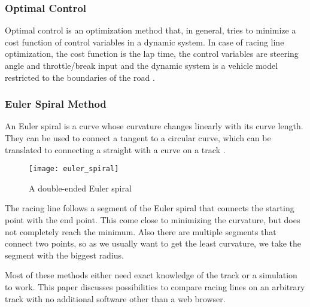 \subsubsection{Optimal Control}
Optimal control is an optimization method that, in general, tries to minimize a cost function of control variables in a dynamic system. In case of racing line optimization, the cost function is the lap time, the control variables are steering angle and throttle/break input and the dynamic system is a vehicle model restricted to the boundaries of the road \cite{gustafsson08}.

\subsubsection{Euler Spiral Method}
An Euler spiral is a curve whose curvature changes linearly with its curve length. They can be used to connect a tangent to a circular curve, which can be translated to connecting a straight with a curve on a track \cite{xiong09}.

\begin{figure}[!ht]
	\centering
	\texttt{[image: euler\_spiral]}
	\caption{A double-ended Euler spiral}
	\label{fig:euler_spiral}
\end{figure}

The racing line follows a segment of the Euler spiral that connects the starting point with the end point. This come close to minimizing the curvature, but does not completely reach the minimum. Also there are multiple segments that connect two points, so as we usually want to get the least curvature, we take the segment with the biggest radius.

Most of these methods either need exact knowledge of the track or a simulation to work. This paper discusses possibilities to compare racing lines on an arbitrary track with no additional software other than a web browser.

\clearpage
